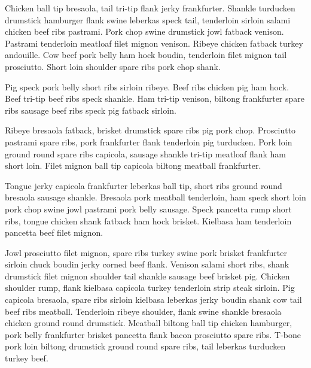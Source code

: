 Chicken ball tip bresaola, tail tri-tip flank jerky frankfurter. Shankle turducken drumstick hamburger flank swine leberkas speck tail, tenderloin sirloin salami chicken beef ribs pastrami. Pork chop swine drumstick jowl fatback venison. Pastrami tenderloin meatloaf filet mignon venison. Ribeye chicken fatback turkey andouille. Cow beef pork belly ham hock boudin, tenderloin filet mignon tail prosciutto. Short loin shoulder spare ribs pork chop shank.

Pig speck pork belly short ribs sirloin ribeye. Beef ribs chicken pig ham hock. Beef tri-tip beef ribs speck shankle. Ham tri-tip venison, biltong frankfurter spare ribs sausage beef ribs speck pig fatback sirloin.

Ribeye bresaola fatback, brisket drumstick spare ribs pig pork chop. Prosciutto pastrami spare ribs, pork frankfurter flank tenderloin pig turducken. Pork loin ground round spare ribs capicola, sausage shankle tri-tip meatloaf flank ham short loin. Filet mignon ball tip capicola biltong meatball frankfurter.

Tongue jerky capicola frankfurter leberkas ball tip, short ribs ground round bresaola sausage shankle. Bresaola pork meatball tenderloin, ham speck short loin pork chop swine jowl pastrami pork belly sausage. Speck pancetta rump short ribs, tongue chicken shank fatback ham hock brisket. Kielbasa ham tenderloin pancetta beef filet mignon.

Jowl prosciutto filet mignon, spare ribs turkey swine pork brisket frankfurter sirloin chuck boudin jerky corned beef flank. Venison salami short ribs, shank drumstick filet mignon shoulder tail shankle sausage beef brisket pig. Chicken shoulder rump, flank kielbasa capicola turkey tenderloin strip steak sirloin. Pig capicola bresaola, spare ribs sirloin kielbasa leberkas jerky boudin shank cow tail beef ribs meatball. Tenderloin ribeye shoulder, flank swine shankle bresaola chicken ground round drumstick. Meatball biltong ball tip chicken hamburger, pork belly frankfurter brisket pancetta flank bacon prosciutto spare ribs. T-bone pork loin biltong drumstick ground round spare ribs, tail leberkas turducken turkey beef.


\bye
